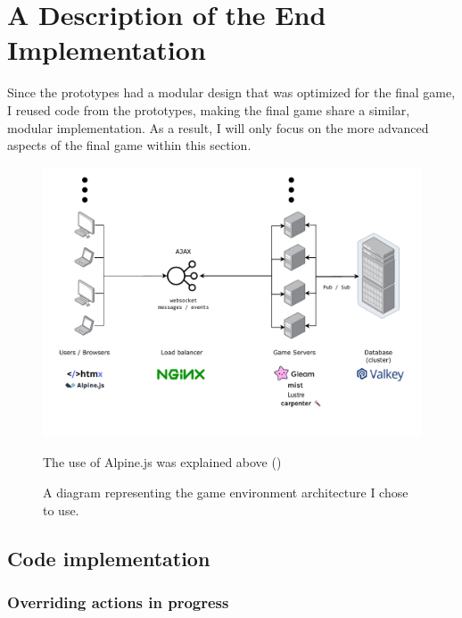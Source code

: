\documentclass[]{final}
\begin{document}
\chapter{A Description of the End Implementation}
Since the prototypes had a modular design that was optimized for the final game,
I reused code from the prototypes, making the final game share a similar,
modular implementation. As a result, I will only focus on the more advanced
aspects of the final game within this section.


\begin{figure}[ht!]
  \centering
  \includegraphics[width=\linewidth]{final_architecture}
  \vspace*{-1.5cm}
  \caption{A diagram representing the game environment architecture I chose to use.}
  \label{fig: 14}
  The use of Alpine.js was explained above {\hypersetup{linkcolor=teal}(\pageref{alpine})}
\end{figure}

\newpage

\section{Code implementation}

\subsection{Overriding actions in progress}
\end{document}
